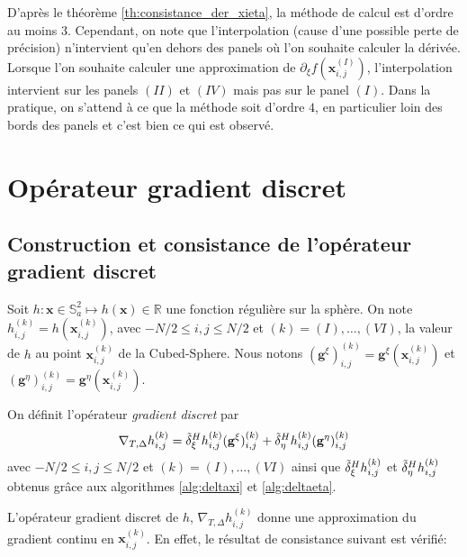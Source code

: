 D'après le théorème \ref{th:consistance_der_xieta}, la méthode de calcul est d'ordre au moins 3. Cependant, on note que l'interpolation (cause d'une possible perte de précision) n'intervient qu'en dehors des panels où l'on souhaite calculer la dérivée.
Lorsque l'on souhaite calculer une approximation de $\partial_{\xi}f(\mathbf{x}_{i,j}^{(I)})$, l'interpolation intervient sur les panels $(II)$ et $(IV)$ mais pas sur le panel $(I)$. Dans la pratique, on s'attend à ce que la méthode soit d'ordre $4$, en particulier loin des bords des panels et c'est bien ce qui est observé.

















\section{Opérateur gradient discret}


\subsection{Construction et consistance de l'opérateur gradient discret}

Soit $h : \mathbf{x} \in \mathbb{S}_a^2 \mapsto h(\mathbf{x}) \in \mathbb{R}$ une fonction régulière sur la sphère. On note $h_{i,j}^{(k)} = h(\mathbf{x}_{i,j}^{(k)})$, avec $-N/2 \leq i,j \leq N/2$ et $(k) = (I) , \ldots , (VI)$, la valeur de $h$ au point $\mathbf{x}_{i,j}^{(k)}$ de la Cubed-Sphere.
Nous notons $( \mathbf{g}^{\xi} )_{i,j}^{(k)} = \mathbf{g}^{\xi} (\mathbf{x}_{i,j}^{(k)})$ et $( \mathbf{g}^{\eta} )_{i,j}^{(k)} = \mathbf{g}^{\eta} (\mathbf{x}_{i,j}^{(k)})$.

\begin{definition}
On définit l'opérateur \textit{gradient discret} par 
\begin{equation}
\nabla_{T,\Delta} h_{i,j}^{(k)} = \tilde{\delta}^H_{\xi} h_{i,j}^{(k)} ( \mathbf{g}^{\xi} )_{i,j}^{(k)} + \tilde{\delta}^H_{\eta} h_{i,j}^{(k)} ( \mathbf{g}^{\eta} )_{i,j}^{(k)}
\end{equation}
avec $-N/2 \leq i,j \leq N/2$ et $(k) = (I), \ldots , (VI)$ ainsi que $\tilde{\delta}^H_{\xi} h_{i,j}^{(k)}$ et $\tilde{\delta}^H_{\eta} h_{i,j}^{(k)}$ obtenus grâce aux algorithmes \ref{alg:deltaxi} et \ref{alg:deltaeta}.
\label{def:gradient_disc}
\end{definition}
L'opérateur gradient discret de $h$, $\nabla_{T,\Delta} h_{i,j}^{(k)}$ donne une approximation du gradient continu en $\mathbf{x}_{i,j}^{(k)}$. En effet, le résultat de consistance suivant est vérifié:

